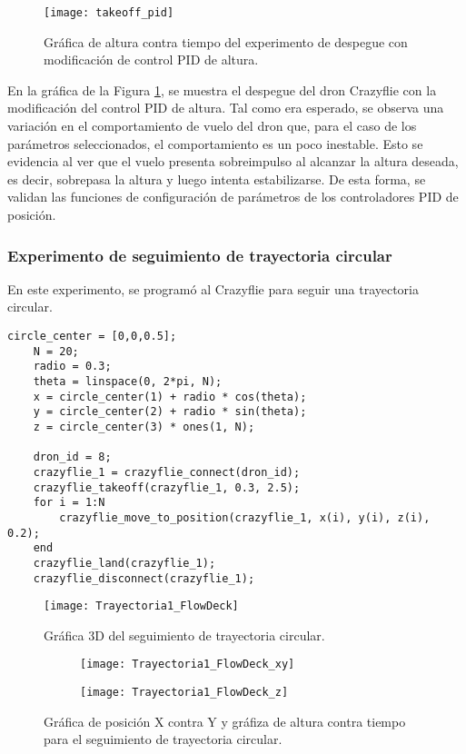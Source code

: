 \begin{figure}[htbp]
	\centering
	\texttt{[image: takeoff\_pid]}
	\caption{Gráfica de altura contra tiempo del experimento de despegue con modificación de control PID de altura.}
	\label{fig:takeoff_pid}
\end{figure} 

En la gráfica de la Figura \ref{fig:takeoff_pid}, se muestra el despegue del dron Crazyflie con la modificación del control PID de altura. Tal como era esperado, se observa una variación en el comportamiento de vuelo del dron que, para el caso de los parámetros seleccionados, el comportamiento es un poco inestable. Esto se evidencia al ver que el vuelo presenta sobreimpulso al alcanzar la altura deseada, es decir, sobrepasa la altura y luego intenta estabilizarse. De esta forma, se validan las funciones de configuración de parámetros de los controladores PID de posición.

\subsubsection{Experimento de seguimiento de trayectoria circular}
En este experimento, se programó al Crazyflie para seguir una trayectoria circular.

\vspace{5mm}
\begin{lstlisting}[caption=Algoritmo de experimento de seguimiento de trayectoria circular con Crazyflie en Matlab., label=code:prueba4_matlab]
	circle_center = [0,0,0.5];
	N = 20;
	radio = 0.3;
	theta = linspace(0, 2*pi, N);  
	x = circle_center(1) + radio * cos(theta);
	y = circle_center(2) + radio * sin(theta);
	z = circle_center(3) * ones(1, N);
	
	dron_id = 8;    
	crazyflie_1 = crazyflie_connect(dron_id);
	crazyflie_takeoff(crazyflie_1, 0.3, 2.5); 
	for i = 1:N
		crazyflie_move_to_position(crazyflie_1, x(i), y(i), z(i), 0.2);
	end
	crazyflie_land(crazyflie_1);
	crazyflie_disconnect(crazyflie_1);
\end{lstlisting}

\begin{figure}[htbp]
	\centering
	\texttt{[image: Trayectoria1\_FlowDeck]}
	\caption{Gráfica 3D del seguimiento de trayectoria circular.}
	\label{fig:Trayectoria1_FlowDeck}
\end{figure} 

\newpage
\begin{figure}[htbp]
	\centering
	\begin{subfigure}[b]{0.4\textwidth}
		\centering
		\texttt{[image: Trayectoria1\_FlowDeck\_xy]}
	\end{subfigure}
	\hspace{0.01\textwidth} %
	\begin{subfigure}[b]{0.47\textwidth}
		\centering
		\texttt{[image: Trayectoria1\_FlowDeck\_z]}
	\end{subfigure}
	\caption{Gráfica de posición X contra Y y gráfiza de altura contra tiempo para el seguimiento de trayectoria circular.}
	\label{fig:Trayectoria1_FlowDeck_xyz}
\end{figure}

